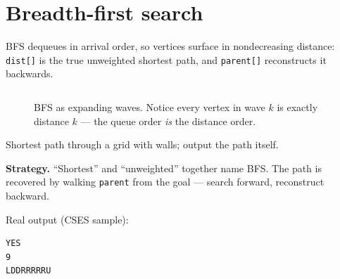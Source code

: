 \section{Breadth-first search}\label{sec:bfs}
BFS dequeues in arrival order, so vertices surface in nondecreasing
distance: \texttt{dist[]} is the true unweighted shortest path, and
\texttt{parent[]} reconstructs it backwards.
\begin{lstlisting}[language=C++,caption={\texttt{bfs.h}: dist +
parent, the reconstruction pair.},label={lst:bfs}]
\end{lstlisting}

\begin{figure}[ht]\centering

\caption{BFS as expanding waves. Notice every vertex in wave $k$ is
exactly distance $k$ --- the queue order \emph{is} the distance
order.}
\label{fig:bfslayers}
\end{figure}
\begin{example}\label{ex:labyrinth}
Shortest path through a grid with walls; output the path itself.
\par\smallskip
\textbf{Strategy.} ``Shortest'' and ``unweighted'' together name BFS.
The path is recovered by walking \texttt{parent} from the goal ---
search forward, reconstruct backward.
\par\smallskip
\begin{solution}

Real output (CSES sample):
\begin{lstlisting}[numbers=none]
YES
9
LDDRRRRRU
\end{lstlisting}
\end{solution}
\end{example}

